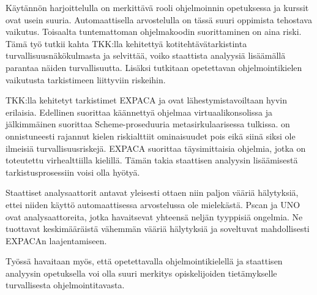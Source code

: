 %
%

\begin{fiabstract}
Käytännön harjoittelulla on merkittävä rooli ohjelmoinnin opetuksessa ja
kurssit ovat usein suuria. Automaattisella arvostelulla on tässä suuri
oppimista tehostava vaikutus. Toisaalta tuntemattoman ohjelmakoodin
suorittaminen on aina riski. Tämä työ tutkii kahta TKK:lla kehitettyä
kotitehtävätarkistinta turvallisuusnäkökulmasta ja selvittää, voiko staattista
analyysiä lisäämällä parantaa näiden turvallisuutta. Lisäksi tutkitaan
opetettavan ohjelmointikielen vaikutusta tarkistimeen liittyviin riskeihin.

TKK:lla kehitetyt tarkistimet EXPACA ja {\scmrobo} ovat lähestymistavoiltaan
hyvin erilaisia. Edellinen suorittaa käännettyä ohjelmaa virtuaalikonsolissa
ja jälkimmäinen suorittaa Scheme-proseduuria metasirkulaarisessa tulkissa.
{\scmrobo} on onnistuneesti rajannut kielen riskialttiit ominaisuudet pois
eikä siinä siksi ole ilmeisiä turvallisuusriskejä. EXPACA suorittaa
täysimittaisia ohjelmia, jotka on toteutettu virhealttiilla kielillä. Tämän
takia staattisen analyysin lisäämisestä tarkistusprosessiin voisi olla hyötyä.

Staattiset analysaattorit antavat yleisesti ottaen niin paljon vääriä
hälytyksiä, ettei niiden käyttö automaattisessa arvostelussa ole mielekästä.
Pscan ja UNO ovat analysaattoreita, jotka havaitsevat yhteensä neljän tyyppisiä
ongelmia. Ne tuottavat keskimääräistä vähemmän vääriä hälytyksiä ja soveltuvat
mahdollisesti EXPACAn laajentamiseen.

Työssä havaitaan myös, että opetettavalla ohjelmointikielellä ja staattisen
analyysin opetuksella voi olla suuri merkitys opiskelijoiden tietämykselle
turvallisesta ohjelmointitavasta.
\end{fiabstract}


